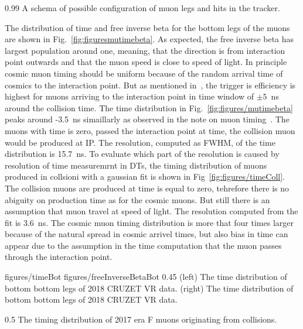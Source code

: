                  {0.99}       %
                 { A schema of possible configuration of muon legs and hits in the tracker. }

The distribution of time and free inverse beta for the bottom legs of the muons are shown in Fig.~\ref{fig:figuresmutimebeta}. As expected, the free inverse beta has largest population around one, meaning, that the direction is from interaction point outwards and that the muon speed is close to speed of light. In principle cosmic muon timing should be uniform because of the random arrival time of cosmics to the interaction point. But as mentioned in~\cite{Chatrchyan:2009ig}, the trigger is efficiency is highest for muons arriving to the interaction point in time window of $\pm 5$~ns around the collision time. The time distribution in Fig.~\ref{fig:figures/mutimebeta} peaks around -3.5~ns simaillarly as observed in the note on muon timing~\cite{Traczyk:1365029}. The muons with time is zero, passed the interaction point at time, the collision muon would be produced at IP. The resolution, computed as FWHM, of the time distribution is 15.7~ns. To evaluate which part of the resolution is caused by resolution of time measuremrnt in DTs, the timing distribution of muons produced in collsioni with a gaussian fit is shown in Fig~\ref{fig:figures/timeColl}. The collision muons are produced at time is equal to zero, tehrefore there is no abiguity on production time as for the cosmic muons. But still there is an assumption that muon travel at speed of light. The resolution computed from the fit is 3.6~ns. The cosmic muon timing distribution is more that four times larger because of the natural spread in cosmic arrivel times, but also bias in time can appear due to the assumption in the time computation that the muon passes through the interaction point.
 

                 {figures/timeBot}
                 {figures/freeInverseBetaBot} %
                 {0.45}       %
                 {(left) The time distribution of bottom bottom legs of 2018 CRUZET VR data. (right) The time distribution of bottom bottom legs of 2018 CRUZET VR data.}


                 {0.5}       %
                 { The timing distribution of 2017 era F muons originating from collisions.  }


